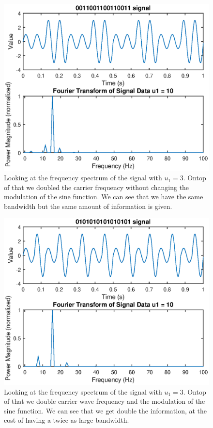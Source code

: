 \documentclass[11pt]{article}
\begin{document}
\begin{figure}[H]
	\centering
	\includegraphics[width=1\textwidth]{../ex2/fftU1-3-double-same}
	\caption{Looking at the frequency spectrum of the signal with $u_1 = 3$. Ontop of that we doubled the carrier frequency without changing the modulation of the sine function. We can see that we have the same bandwidth but the same amount of information is given.}
	\label{fig:fftU1-3}
\end{figure}
\begin{figure}[H]
	\centering
	\includegraphics[width=1\textwidth]{../ex2/fftU1-3-double}
	\caption{Looking at the frequency spectrum of the signal with $u_1 = 3$. Ontop of that we double carrier wave frequency and the modulation of the sine function. We can see that we get double the information, at the cost of having a twice as large bandwidth.}
	\label{fig:fftU1-10}
\end{figure}
\end{document}
